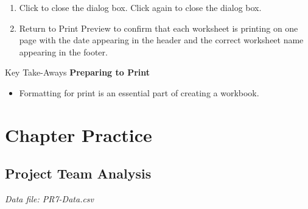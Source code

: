 \begin{enumerate}[resume]	
	\item Click  to close the  dialog box. 
	Click  again to close the  dialog box.
	\item Return to Print Preview to confirm that each worksheet is printing on one page with the date appearing in the header and the correct worksheet name appearing in the footer.
\end{enumerate}

\begin{center}
	\begin{tkwbox}{Key Take-Aways}
		\textbf{Preparing to Print}
		\\
		\begin{itemize}
			\setlength{\itemsep}{0pt}
			\setlength{\parskip}{0pt}
			\setlength{\parsep}{0pt}
			
			\item Formatting for print is an essential part of creating a workbook.
			
		\end{itemize}
	\end{tkwbox}
\end{center}

\section{Chapter Practice}

\subsection{Project Team Analysis}

\textit{Data file: PR7-Data.csv}

